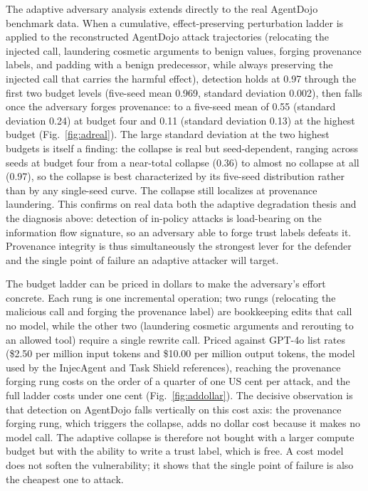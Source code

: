 \documentclass[journal]{IEEEtran}
\theoremstyle{remark}
\begin{document}
The adaptive adversary analysis extends directly to the real AgentDojo benchmark data. When a cumulative, effect-preserving perturbation ladder is applied to the reconstructed AgentDojo attack trajectories (relocating the injected call, laundering cosmetic arguments to benign values, forging provenance labels, and padding with a benign predecessor, while always preserving the injected call that carries the harmful effect), detection holds at 0.97 through the first two budget levels (five-seed mean 0.969, standard deviation 0.002), then falls once the adversary forges provenance: to a five-seed mean of 0.55 (standard deviation 0.24) at budget four and 0.11 (standard deviation 0.13) at the highest budget (Fig.~\ref{fig:adreal}). The large standard deviation at the two highest budgets is itself a finding: the collapse is real but seed-dependent, ranging across seeds at budget four from a near-total collapse (0.36) to almost no collapse at all (0.97), so the collapse is best characterized by its five-seed distribution rather than by any single-seed curve. The collapse still localizes at provenance laundering. This confirms on real data both the adaptive degradation thesis and the diagnosis above: detection of in-policy attacks is load-bearing on the information flow signature, so an adversary able to forge trust labels defeats it. Provenance integrity is thus simultaneously the strongest lever for the defender and the single point of failure an adaptive attacker will target.

The budget ladder can be priced in dollars to make the adversary's effort concrete. Each rung is one incremental operation; two rungs (relocating the malicious call and forging the provenance label) are bookkeeping edits that call no model, while the other two (laundering cosmetic arguments and rerouting to an allowed tool) require a single rewrite call. Priced against GPT-4o list rates (\$2.50 per million input tokens and \$10.00 per million output tokens, the model used by the InjecAgent and Task Shield references), reaching the provenance forging rung costs on the order of a quarter of one US cent per attack, and the full ladder costs under one cent (Fig.~\ref{fig:addollar}). The decisive observation is that detection on AgentDojo falls vertically on this cost axis: the provenance forging rung, which triggers the collapse, adds no dollar cost because it makes no model call. The adaptive collapse is therefore not bought with a larger compute budget but with the ability to write a trust label, which is free. A cost model does not soften the vulnerability; it shows that the single point of failure is also the cheapest one to attack.
\end{document}
